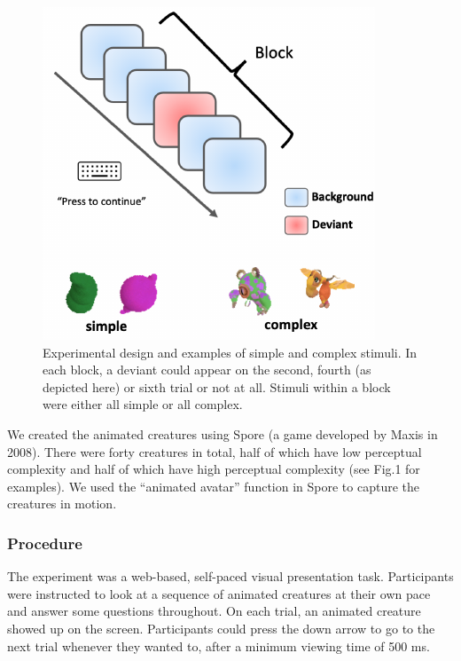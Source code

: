 \documentclass[10pt, letterpaper]{article}
\newenvironment{CodeChunk}{}{}
\begin{document}
\begin{CodeChunk}
\begin{figure}[h]

{\centering \includegraphics{figs/experimental_design-1} 

}

\caption[Experimental design and examples of simple and complex stimuli]{Experimental design and examples of simple and complex stimuli. In each block, a deviant could appear on the second, fourth (as depicted here) or sixth trial or not at all. Stimuli within a block were either all simple or all complex.}\label{fig:experimental_design}
\end{figure}
\end{CodeChunk}

We created the animated creatures using Spore (a game developed by Maxis
in 2008). There were forty creatures in total, half of which have low
perceptual complexity and half of which have high perceptual complexity
(see Fig.1 for examples). We used the ``animated avatar'' function in
Spore to capture the creatures in motion.

\hypertarget{procedure}{%
\subsubsection{Procedure}\label{procedure}}

The experiment was a web-based, self-paced visual presentation task.
Participants were instructed to look at a sequence of animated creatures
at their own pace and answer some questions throughout. On each trial,
an animated creature showed up on the screen. Participants could press
the down arrow to go to the next trial whenever they wanted to, after a
minimum viewing time of 500 ms.
\end{document}
